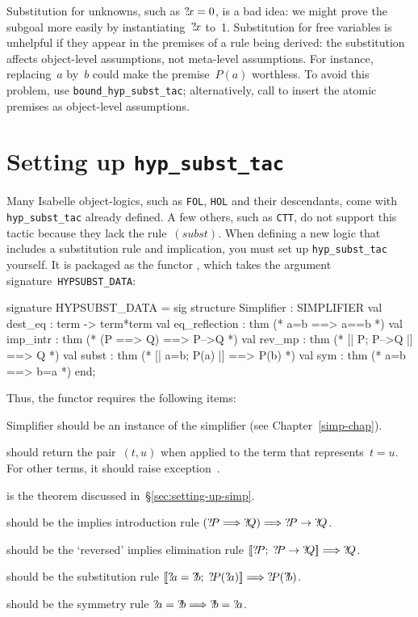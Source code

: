 Substitution for unknowns, such as ${?\!x}=0$, is a bad idea: we might prove
the subgoal more easily by instantiating~${?\!x}$ to~1.
Substitution for free variables is unhelpful if they appear in the
premises of a rule being derived: the substitution affects object-level
assumptions, not meta-level assumptions.  For instance, replacing~$a$
by~$b$ could make the premise~$P(a)$ worthless.  To avoid this problem, use
{\tt bound_hyp_subst_tac}; alternatively, call  to
insert the atomic premises as object-level assumptions.


\section{Setting up {\tt hyp_subst_tac}} 
Many Isabelle object-logics, such as {\tt FOL}, {\tt HOL} and their
descendants, come with {\tt hyp_subst_tac} already defined.  A few others,
such as {\tt CTT}, do not support this tactic because they lack the
rule~$(subst)$.  When defining a new logic that includes a substitution
rule and implication, you must set up {\tt hyp_subst_tac} yourself.  It
is packaged as the \ML{} functor , which takes the
argument signature~{\tt HYPSUBST_DATA}:
\begin{ttbox} 
signature HYPSUBST_DATA =
  sig
  structure Simplifier : SIMPLIFIER
  val dest_eq          : term -> term*term
  val eq_reflection    : thm               (* a=b ==> a==b *)
  val imp_intr         : thm               (* (P ==> Q) ==> P-->Q *)
  val rev_mp           : thm               (* [| P;  P-->Q |] ==> Q *)
  val subst            : thm               (* [| a=b;  P(a) |] ==> P(b) *)
  val sym              : thm               (* a=b ==> b=a *)
  end;
\end{ttbox}
Thus, the functor requires the following items:
\begin{ttdescription}
\item[Simplifier] should be an instance of the simplifier (see
  Chapter~\ref{simp-chap}).

\item[\ttindexbold{dest_eq}] should return the pair~$(t,u)$ when
applied to the \ML{} term that represents~$t=u$.  For other terms, it
should raise exception~.

\item[\tdxbold{eq_reflection}] is the theorem discussed
  in~\S\ref{sec:setting-up-simp}. 

\item[\tdxbold{imp_intr}] should be the implies introduction
rule $({?\!P}\Longrightarrow{?\!Q})\Longrightarrow {?\!P}\rightarrow{?\!Q}$.

\item[\tdxbold{rev_mp}] should be the `reversed' implies elimination
rule $\mathopen{[\![}{?\!P};  \;{?\!P}\rightarrow{?\!Q}\mathclose{]\!]} \Longrightarrow {?\!Q}$.

\item[\tdxbold{subst}] should be the substitution rule
$\List{\Var{a}=\Var{b};\; \Var{P}(\Var{a})} \Imp \Var{P}(\Var{b})$.

\item[\tdxbold{sym}] should be the symmetry rule
${?\!a}={?\!b}\Longrightarrow{?\!b}={?\!a}$.
\end{ttdescription}
